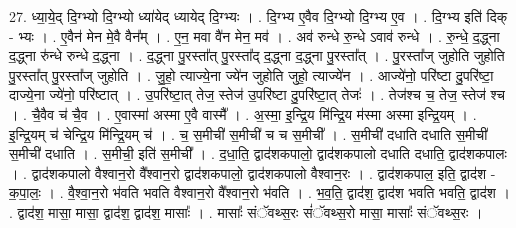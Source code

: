 \documentclass[17pt]{extarticle}
\begin{document}
27. ध्या॒ये॒द् दि॒ग्भ्यो दि॒ग्भ्यो ध्या॑येद् ध्यायेद् दि॒ग्भ्यः । . दि॒ग्भ्य ए॒वैव दि॒ग्भ्यो दि॒ग्भ्य ए॒व । . दि॒ग्भ्य इति॑ दिक् - भ्यः । . ए॒वैन॑ मेन मे॒वै वैन᳚म् । . ए॒न॒ मवा वै॑न मेन॒ मव॑ । . अव॑ रुन्धे रु॒न्धे ऽवाव॑ रुन्धे । . रु॒न्धे॒ द॒द्ध्ना द॒द्ध्ना रु॑न्धे रुन्धे द॒द्ध्ना । . द॒द्ध्ना पु॒रस्ता᳚त् पु॒रस्ता᳚द् द॒द्ध्ना द॒द्ध्ना पु॒रस्ता᳚त् । . पु॒रस्ता᳚ज् जुहोति जुहोति पु॒रस्ता᳚त् पु॒रस्ता᳚ज् जुहोति । . जु॒हो॒ त्याज्ये॒ना ज्ये॑न जुहोति जुहो॒ त्याज्ये॑न । . आज्ये॑नो॒ परि॑ष्टा दु॒परि॑ष्टा॒ दाज्ये॒ना ज्ये॑नो॒ परि॑ष्टात् । . उ॒परि॑ष्टा॒त् तेज॒ स्तेज॑ उ॒परि॑ष्टा दु॒परि॑ष्टा॒त् तेजः॑ । . तेज॑श्च च॒ तेज॒ स्तेज॑ श्च । . चै॒वैव च॑ चै॒व । . ए॒वास्मा॑ अस्मा ए॒वै वास्मै᳚ । . अ॒स्मा॒ इ॒न्द्रि॒य मि॑न्द्रि॒य म॑स्मा अस्मा इन्द्रि॒यम् । . इ॒न्द्रि॒यम् च॑ चेन्द्रि॒य मि॑न्द्रि॒यम् च॑ । . च॒ स॒मीची॑ स॒मीची॑ च च स॒मीची᳚ । . स॒मीची॑ दधाति दधाति स॒मीची॑ स॒मीची॑ दधाति । . स॒मीची॒ इति॑ स॒मीची᳚ । . द॒धा॒ति॒ द्वाद॑शकपालो॒ द्वाद॑शकपालो दधाति दधाति॒ द्वाद॑शकपालः । . द्वाद॑शकपालो वैश्वान॒रो वै᳚श्वान॒रो द्वाद॑शकपालो॒ द्वाद॑शकपालो वैश्वान॒रः । . द्वाद॑शकपाल॒ इति॒ द्वाद॑श - क॒पा॒लः॒ । . वै॒श्वा॒न॒रो भ॑वति भवति वैश्वान॒रो वै᳚श्वान॒रो भ॑वति । . भ॒व॒ति॒ द्वाद॑श॒ द्वाद॑श भवति भवति॒ द्वाद॑श । . द्वाद॑श॒ मासा॒ मासा॒ द्वाद॑श॒ द्वाद॑श॒ मासाः᳚ । . मासाः᳚ संॅवथ्स॒रः सं॑ॅवथ्स॒रो मासा॒ मासाः᳚ संॅवथ्स॒रः । \newline
\end{document}

